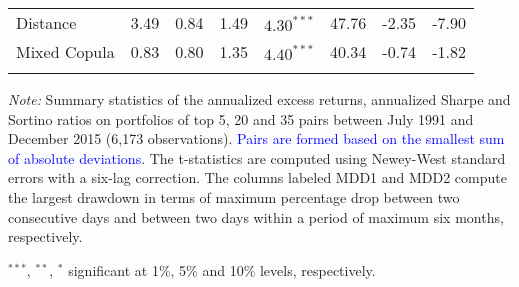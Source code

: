 \documentclass[pdf,9pt,xcolor=dvipsnames,hide notes]{beamer}
\begin{document}
\begin{frame}
\begin{threeparttable}[H]
\begin{tabularx}{\textwidth}{@{\extracolsep{\fill}}llllllll@{}}
			Distance & \cellcolor{celadon} 3.49  &  \cellcolor{celadon} 0.84  & 1.49  & $4.30^{***}$  & 47.76 & -2.35  & -7.90 \\
			Mixed Copula & 0.83  & 0.80  & 1.35  & $4.40^{***}$  & 40.34 & -0.74  & -1.82  \\
			\multicolumn{1}{r}{} & \multicolumn{1}{r}{} & \multicolumn{1}{r}{} & \multicolumn{1}{r}{} & \multicolumn{1}{r}{} & \multicolumn{1}{r}{} & \multicolumn{1}{r}{} & \multicolumn{1}{r}{} \\
			\bottomrule
		\end{tabularx}%
		\begin{tablenotes}
			\item \textit{Note:} \tiny Summary statistics of the annualized excess returns, annualized Sharpe and Sortino ratios on portfolios of top 5, 20 and 35 pairs between July 1991 and December 2015 (6,173 observations). \textcolor{blue} {Pairs are formed based on the smallest sum of absolute deviations}. The t-statistics are computed using Newey-West standard errors with a six-lag correction. The columns labeled MDD1 and MDD2 compute the largest drawdown in terms of maximum percentage drop between two consecutive days and between two days within a period of maximum six months, respectively.
			\item \scriptsize $^{\ast\ast\ast}$, $^{\ast\ast}$, $^{\ast}$  significant at 1\%, 5\% and 10\% levels, respectively.
		\end{tablenotes}
		\label{tab:table102}%
	\end{threeparttable}%
	
	
\end{frame}
\end{document}

